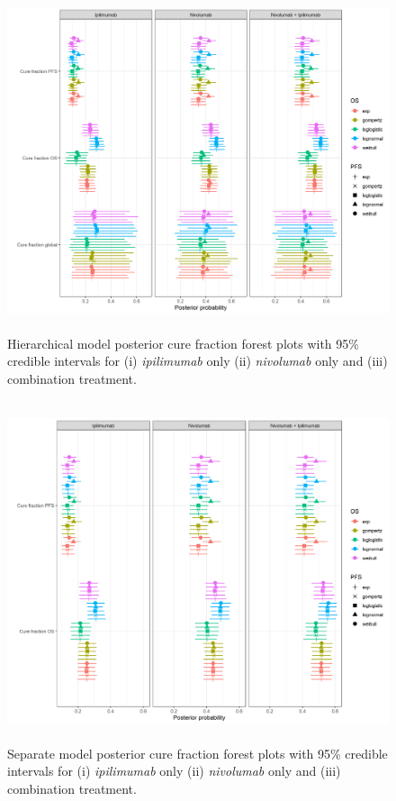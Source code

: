 \documentclass[AMA,STIX1COL]{WileyNJD-v2}
\begin{document}
\begin{figure}
\centering
\includegraphics[height=10cm, width=0.9\linewidth]{forest_plot_joint_cf_hier.png}
\caption{\label{fig:cf_forest_all_tx} Hierarchical model posterior cure fraction forest plots with 95\% credible intervals for (i) {\it ipilimumab} only (ii) {\it nivolumab} only and (iii) combination treatment.}
\end{figure}

\begin{figure}
\centering
\includegraphics[height=10cm, width=0.9\linewidth]{forest_plot_joint_all_tx_separate.png}
\caption{\label{fig:cf_forest_all_tx_sep} Separate model posterior cure fraction forest plots with 95\% credible intervals for (i) {\it ipilimumab} only (ii) {\it nivolumab} only and (iii) combination treatment.}
\end{figure}
\end{document}
